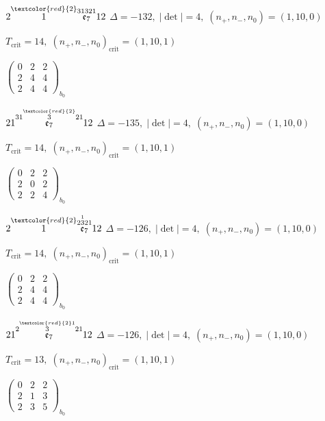 \documentclass[10pt]{article}
\begin{document}
\smallskip

$2\overset{\textcolor{red}{2}}{1}\overset{31321}{\mathfrak{e}_7}12$ \quad $\Delta=-132,\; |\det|=4,\; (n_+,n_-,n_0)=(1,10,0)$

\hspace{1em}$T_{\text{crit}}=14,\; (n_+,n_-,n_0)_{\text{crit}}=(1,10,1)$

\hspace{2em}$\left(\begin{smallmatrix}0 & 2 & 2 \\ 2 & 4 & 4 \\ 2 & 4 & 4\end{smallmatrix}\right)_{\!b_0}$

$21\overset{31\overset{\textcolor{red}{2}}{3}21}{\mathfrak{e}_7}12$ \quad $\Delta=-135,\; |\det|=4,\; (n_+,n_-,n_0)=(1,10,0)$

\hspace{1em}$T_{\text{crit}}=14,\; (n_+,n_-,n_0)_{\text{crit}}=(1,10,1)$

\hspace{2em}$\left(\begin{smallmatrix}0 & 2 & 2 \\ 2 & 0 & 2 \\ 2 & 2 & 4\end{smallmatrix}\right)_{\!b_0}$

\smallskip

$2\overset{\textcolor{red}{2}}{1}\overset{2\overset{1}{3}21}{\mathfrak{e}_7}12$ \quad $\Delta=-126,\; |\det|=4,\; (n_+,n_-,n_0)=(1,10,0)$

\hspace{1em}$T_{\text{crit}}=14,\; (n_+,n_-,n_0)_{\text{crit}}=(1,10,1)$

\hspace{2em}$\left(\begin{smallmatrix}0 & 2 & 2 \\ 2 & 4 & 4 \\ 2 & 4 & 4\end{smallmatrix}\right)_{\!b_0}$

$21\overset{2\overset{\textcolor{red}{2}1}{3}21}{\mathfrak{e}_7}12$ \quad $\Delta=-126,\; |\det|=4,\; (n_+,n_-,n_0)=(1,10,0)$

\hspace{1em}$T_{\text{crit}}=13,\; (n_+,n_-,n_0)_{\text{crit}}=(1,10,1)$

\hspace{2em}$\left(\begin{smallmatrix}0 & 2 & 2 \\ 2 & 1 & 3 \\ 2 & 3 & 5\end{smallmatrix}\right)_{\!b_0}$
\end{document}
